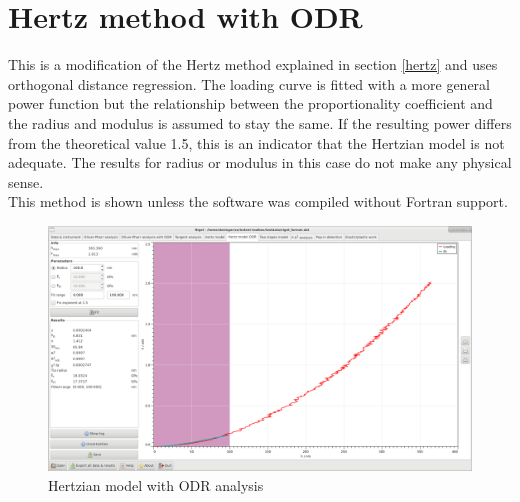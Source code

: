 \section{Hertz method with ODR} \label{hertz_odr}
This is a modification of the Hertz method explained in section \ref{hertz} and uses orthogonal distance regression. 
The loading curve is fitted with a more general power function but the relationship between the proportionality coefficient and the radius and modulus is assumed to stay the same.
If the resulting power differs from the theoretical value 1.5, this is an indicator that the Hertzian model is not adequate. The results for radius or modulus in this case do not make any physical sense.\\
This method is shown unless the software was compiled without Fortran support.  \\

\begin{figure}[ht]
  \centering
  \includegraphics[width=\textwidth]{images/screen-hertz-odr}
  \caption{Hertzian model with ODR analysis}
\end{figure}

